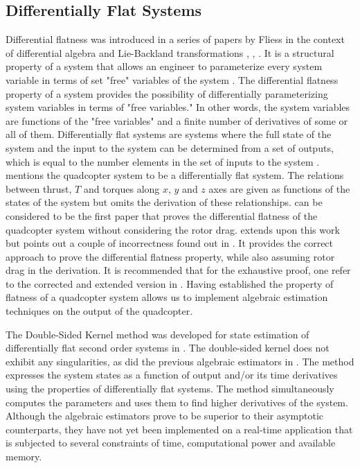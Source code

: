 \documentclass[letterpaper%
, twoside%
, 12pt%
,memoire%
, english%
,creativecommons,hyperref%
]{thETS}
\newcommand{\nocontentsline}[3]{}
\newcommand{\tocless}[2]{\bgroup\let\addcontentsline=\nocontentsline#1{#2}\egroup}
\begin{document}
\begin{introduction}
\tocless \subsection{Differentially Flat Systems} \label{subsec:diffflatnessquad}
Differential flatness was introduced in a series of papers by Fliess in the context of differential algebra and Lie-Backland transformations \citep{RN78}, \citep{RN79}, \citep{RN80}. It is a structural property of a system that allows an engineer to parameterize every system variable in terms of set "free" variables of the system \citep{RN77}. 
The differential flatness property of a system provides the possibility of differentially parameterizing system variables in terms of "free variables." In other words, the system variables are functions of the "free variables" and a finite number of derivatives of some or all of them.
Differentially flat systems are systems where the full state of the system and the input to the system can be determined from a set of outputs, which is equal to the number elements in the set of inputs to the system \citep{RN73}. 
\citep{RN81} mentions the quadcopter system to be a differentially flat system.  The relations between thrust, $T$ and torques along  $x$, $y$ and $z$ axes are given as functions of the states of the system but omits the derivation of these relationships. \citep{mellinger2011minimum} can be considered to be the first paper that proves the differential flatness of the quadcopter system without considering the rotor drag. \citep{faessler2017differential} extends upon this work but points out a couple of incorrectness found out in \citep{mellinger2011minimum}. It provides the correct approach to prove the differential flatness property, while also assuming rotor drag in the derivation. It is recommended that for the exhaustive proof, one refer to the corrected and extended version in \citep{faessler2017differential}. Having established the property of flatness of a quadcopter system allows us to implement algebraic estimation techniques on the output of the quadcopter. 

\tocless \subsection{Algebraic Differentiation and the Double Sided Kernel}
The Double-Sided Kernel method was developed for state estimation of differentially flat second order systems in \citep{RN76}. The double-sided kernel does not exhibit any singularities, as did the previous algebraic estimators in \citep{RN75}. The method expresses the system states as a function of output and/or its time derivatives using the properties of differentially flat systems. The method simultaneously computes the parameters and uses them to find higher derivatives of the system.\\
Although the algebraic estimators prove to be superior to their asymptotic counterparts, they have not yet been implemented on a real-time application that is subjected to several constraints of time, computational power and available memory. 


\end{introduction}
\end{document}
